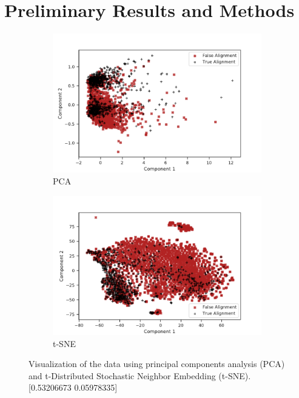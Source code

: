 \documentclass{article}
\begin{document}
\section*{Preliminary Results and Methods}

\begin{figure}
\centering
\begin{subfigure}{.5\textwidth}
  \centering
\includegraphics[width=\linewidth]{FinalProject/dim_red_pca.pdf}
  \caption{PCA}
  \label{fig:sub1}
\end{subfigure}%
\begin{subfigure}{.5\textwidth}
  \centering
  \includegraphics[width=\linewidth]{FinalProject/dim_red_tsne.pdf}
  \caption{t-SNE}
\label{fig:sub2}
\end{subfigure}
\caption{ Visualization of the data using principal components analysis (PCA) and t-Distributed Stochastic Neighbor Embedding (t-SNE). [0.53206673 0.05978335] }
\label{fig:dim}
\end{figure}
\end{document}
